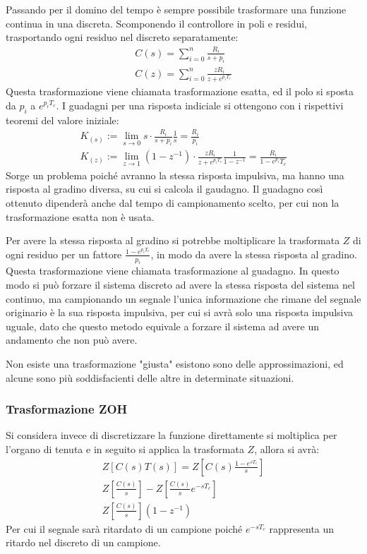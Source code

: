 \documentclass{article}
\numberwithin{equation}{subsection}
\begin{document}
Passando per il domino del tempo è sempre possibile trasformare una funzione continua in una discreta. Scomponendo il controllore in poli e 
residui, trasportando ogni residuo nel discreto separatamente:
\begin{gather}
    C(s)=\displaystyle\sum_{i=0}^{n}\frac{R_i}{s+p_i}\\
    C(z)=\displaystyle\sum_{i=0}^{n}\frac{zR_i}{z+e^{p_iT_c}}
\end{gather}
Questa trasformazione viene chiamata trasformazione esatta, ed il polo si sposta da $p_i$ a $e^{p_iT_c}$. 
I guadagni per una risposta indiciale si ottengono con i rispettivi teoremi del valore iniziale:
\begin{gather}
    K_{(s)}:=\lim_{s\to0}s\cdot\displaystyle\frac{R_i}{s+p_i}\frac{1}{s}=\frac{R_i}{p_i}\\
    K_{(z)}:=\lim_{z\to1}(1-z^{-1})\cdot\displaystyle\frac{zR_i}{z+e^{p_iT_c}}\frac{1}{1-z^{-1}}=\frac{R_i}{1-e^{p_i}T_c}
\end{gather} Sorge un problema 
poiché avranno la stessa risposta impulsiva, ma hanno una risposta al gradino diversa, su cui si calcola il gaudagno. Il guadagno così ottenuto dipenderà anche dal tempo 
di campionamento scelto, per cui non la trasformazione esatta non è usata. 

Per avere la stessa risposta al gradino si potrebbe 
moltiplicare la trasformata $Z$ di ogni residuo per un fattore $\displaystyle\frac{1-e^{p_iT_c}}{p_i}$, in modo da avere la stessa risposta al gradino. Questa trasformazione 
viene chiamata trasformazione al guadagno. 
In questo modo si può forzare il sistema discreto ad avere la stessa risposta del sistema nel continuo, ma campionando un segnale l'unica informazione che rimane del segnale 
originario è la sua risposta impulsiva, per cui si avrà solo una risposta impulsiva uguale, dato che questo metodo equivale a forzare il sistema ad avere un andamento 
che non può avere. 

Non esiste una trasformazione "giusta" esistono sono delle 
approssimazioni, ed alcune sono più soddisfacienti delle altre in determinate situazioni.  

\subsubsection{Trasformazione ZOH}

Si considera invece di discretizzare la funzione direttamente si moltiplica per l'organo di tenuta e in seguito si applica la trasformata $Z$, allora si avrà:
\begin{gather}
    Z\left[C(s)T(s)\right]=Z\left[C(s)\displaystyle\frac{1-e^{sT_c}}{s}\right]\\
    Z\left[\displaystyle\frac{C(s)}{s}\right]-Z\left[\displaystyle\frac{C(s)}{s}e^{-sT_c}\right]\\
    Z\left[\displaystyle\frac{C(s)}{s}\right](1-z^{-1})
\end{gather}
Per cui il segnale sarà ritardato di un campione poiché $e^{-sT_c}$ rappresenta un ritardo nel discreto di un campione. 
\end{document}
